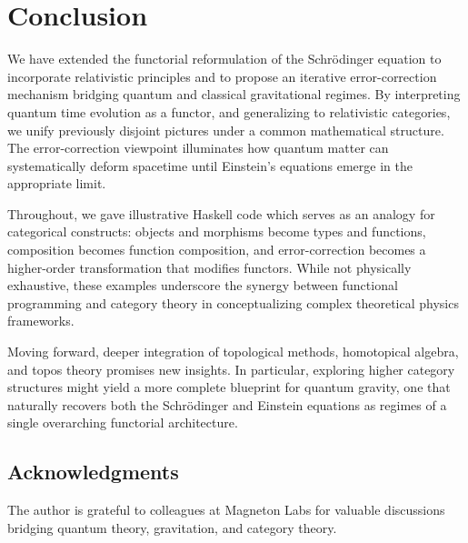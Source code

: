 \documentclass[12pt]{article}
\begin{document}
\section{Conclusion}
We have extended the functorial reformulation of the Schr\"odinger equation to incorporate relativistic principles and to propose an iterative error-correction mechanism bridging quantum and classical gravitational regimes. By interpreting quantum time evolution as a functor, and generalizing to relativistic categories, we unify previously disjoint pictures under a common mathematical structure. The error-correction viewpoint illuminates how quantum matter can systematically deform spacetime until Einstein's equations emerge in the appropriate limit.

Throughout, we gave illustrative Haskell code which serves as an analogy for categorical constructs: objects and morphisms become types and functions, composition becomes function composition, and error-correction becomes a higher-order transformation that modifies functors. While not physically exhaustive, these examples underscore the synergy between functional programming and category theory in conceptualizing complex theoretical physics frameworks.

Moving forward, deeper integration of topological methods, homotopical algebra, and topos theory promises new insights. In particular, exploring higher category structures might yield a more complete blueprint for quantum gravity, one that naturally recovers both the Schr\"odinger and Einstein equations as regimes of a single overarching functorial architecture.

\subsection*{Acknowledgments}
The author is grateful to colleagues at Magneton Labs for valuable discussions bridging quantum theory, gravitation, and category theory.
\end{document}
